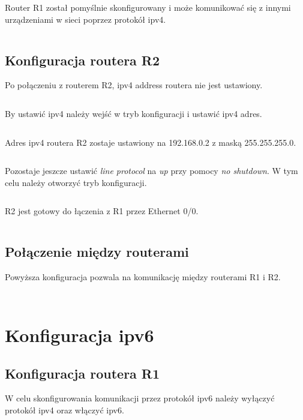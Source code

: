 \documentclass[a4paper,12pt,notitlepage]{article}
\begin{document}
Router R1 został pomyślnie skonfigurowany i może komunikować się z innymi urządzeniami w sieci poprzez protokół ipv4.%
\inputminted[label=Końcowa konfiguracja routera R1, firstline=129, lastline=154]{text}{R1.txt}

\subsection{Konfiguracja routera R2}

Po połączeniu z routerem R2, ipv4 address routera nie jest ustawiony.
\inputminted[label=Początkowa konfiguracja R2, firstline=88, lastline=91]{text}{R2.txt}
By ustawić ipv4 należy wejść w tryb konfiguracji i ustawić ipv4 adres.
\inputminted[label=Ustawianie ipv4 dla R2, firstline=113, lastline=120]{text}{R2.txt}
Adres ipv4 routera R2 zostaje ustawiony na 192.168.0.2 z maską 255.255.255.0.
\inputminted[label=R2 z ustawionym ipv4, firstline=121, lastline=124]{text}{R2.txt}
Pozostaje jeszcze ustawić \textit{line protocol} na \textit{up} przy pomocy \textit{no shutdown}. W tym celu należy otworzyć tryb konfiguracji.
\inputminted[label=Ustawianie line protocol na up, firstline=147, lastline=157]{text}{R2.txt}
R2 jest gotowy do łączenia z R1 przez Ethernet 0/0.
\inputminted[label=Końcowa konfiguracja R2 dla ipv4, firstline=162, lastline=185]{text}{R2.txt}

\subsection{Połączenie między routerami}

Powyższa konfiguracja pozwala na komunikację między routerami R1 i R2.%
\inputminted[label=Próba komunikacji R2 z R1, firstline=211, lastline=216]{text}{R2.txt}%
\inputminted[label=Próba komunikacji R1 z R2, firstline=155, lastline=160]{text}{R1.txt}

\section{Konfiguracja ipv6}

\subsection{Konfiguracja routera R1}

W celu skonfigurowania komunikacji przez protokół ipv6 należy wyłączyć protokół ipv4 oraz włączyć ipv6.%
\inputminted[label=Przełączanie na ipv6, firstline=171, lastline=177]{text}{R1.txt}
\end{document}
